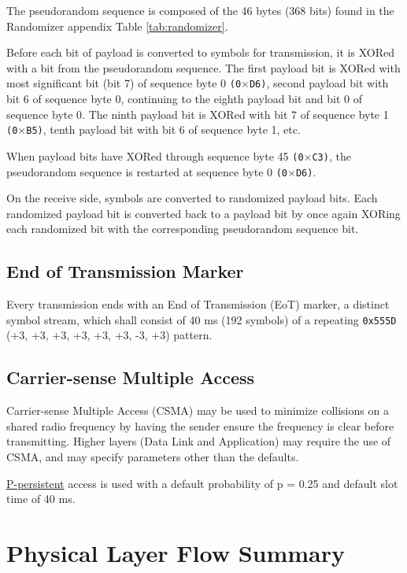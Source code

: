 \documentclass[a4paper,11pt,oneside]{book}
\begin{document}
The pseudorandom sequence is composed of the 46 bytes (368 bits) found in the Randomizer appendix Table \ref{tab:randomizer}.

Before each bit of payload is converted to symbols for transmission, it is XORed with a bit from the pseudorandom sequence. The first payload bit is XORed with most significant bit (bit 7) of sequence byte 0 \texttt{(0$\times$D6)}, second payload bit with bit 6 of sequence byte 0, continuing to the eighth payload bit and bit 0 of sequence byte 0. The ninth payload bit is XORed with bit 7 of sequence byte 1 \texttt{(0$\times$B5)}, tenth payload bit with bit 6 of sequence byte 1, etc.

When payload bits have XORed through sequence byte 45 \texttt{(0$\times$C3)}, the pseudorandom sequence is restarted at sequence byte 0 \texttt{(0$\times$D6)}.

On the receive side, symbols are converted to randomized payload bits. Each randomized payload bit is converted back to a payload bit by once
again XORing each randomized bit with the corresponding pseudorandom sequence bit.

\subsection{End of Transmission Marker}

Every transmission ends with an End of Transmission (EoT) marker, a distinct symbol stream, which shall consist of 40 ms (192 symbols) of a repeating \texttt{0x555D} (+3, +3, +3, +3, +3, +3, -3, +3) pattern.

\subsection{Carrier-sense Multiple Access}

Carrier-sense Multiple Access (CSMA) may be used to minimize collisions on a shared radio frequency by having the sender ensure the frequency is clear before transmitting. Higher layers (Data Link and Application) may require the use of CSMA, and may specify parameters other than the defaults.

\href{https://en.wikipedia.org/wiki/Carrier-sense_multiple_access}{P-persistent} access is used with a default probability of p = 0.25 and default slot time of 40 ms.

\section{Physical Layer Flow Summary}
\end{document}
